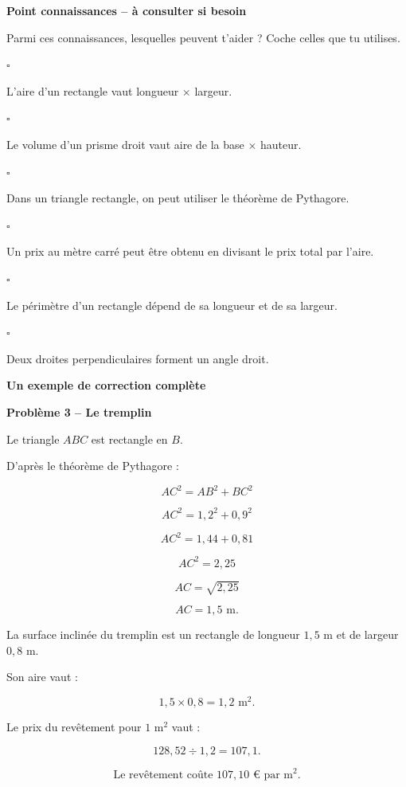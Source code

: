 \documentclass[11pt,a4paper]{article}
\newcommand{\titrecorrection}[1]{%
\noindent
\begin{minipage}{\linewidth}
\centering
{\sffamily\LARGE\bfseries\color{TitreC}
Un exemple de correction complète}

\vspace{0.5mm}

{\sffamily\large\bfseries\color{SavoirC}
#1}
\end{minipage}

\vspace{2mm}
}
\newcommand{\casecocher}[1]{%
\noindent
\(\square\)\hspace{0.35em}%
\parbox[t]{0.89\linewidth}{#1}
\par
\vspace{0.15em}
}
\newcommand{\pagecorrection}[2]{%

\titrecorrection{#1}

\begin{correctionbox}

#2

\end{correctionbox}
}
\begin{document}
\begin{connaissancesbox}

{\sffamily\bfseries\color{SavoirC}
Point connaissances -- à consulter si besoin}

\smallskip

Parmi ces connaissances, lesquelles peuvent t'aider ?
Coche celles que tu utilises.

\smallskip

\begin{minipage}[t]{0.49\linewidth}

\casecocher{L'aire d'un rectangle vaut
longueur \(\times\) largeur.}

\casecocher{Le volume d'un prisme droit vaut
aire de la base \(\times\) hauteur.}

\casecocher{Dans un triangle rectangle,
on peut utiliser le théorème de Pythagore.}

\end{minipage}
\hfill
\begin{minipage}[t]{0.49\linewidth}

\casecocher{Un prix au mètre carré peut être obtenu
en divisant le prix total par l'aire.}

\casecocher{Le périmètre d'un rectangle dépend
de sa longueur et de sa largeur.}

\casecocher{Deux droites perpendiculaires forment un angle droit.}

\end{minipage}

\end{connaissancesbox}

\newpage


\pagecorrection{Problème 3 -- Le tremplin}{

Le triangle \(ABC\) est rectangle en \(B\).

D'après le théorème de Pythagore :

\[
AC^2=AB^2+BC^2
\]

\[
AC^2=1{,}2^2+0{,}9^2
\]

\[
AC^2=1{,}44+0{,}81
\]

\[
AC^2=2{,}25
\]

\[
AC=\sqrt{2{,}25}
\]

\[
AC=1{,}5\text{ m}.
\]

La surface inclinée du tremplin est un rectangle
de longueur \(1{,}5\) m et de largeur \(0{,}8\) m.

Son aire vaut :

\[
1{,}5\times0{,}8
=1{,}2\text{ m}^2.
\]

Le prix du revêtement pour \(1\text{ m}^2\) vaut :

\[
128{,}52\div1{,}2
=107{,}1.
\]

\[
\boxed{\text{Le revêtement coûte }107{,}10\text{ € par m}^2.}
\]
}
\end{document}

